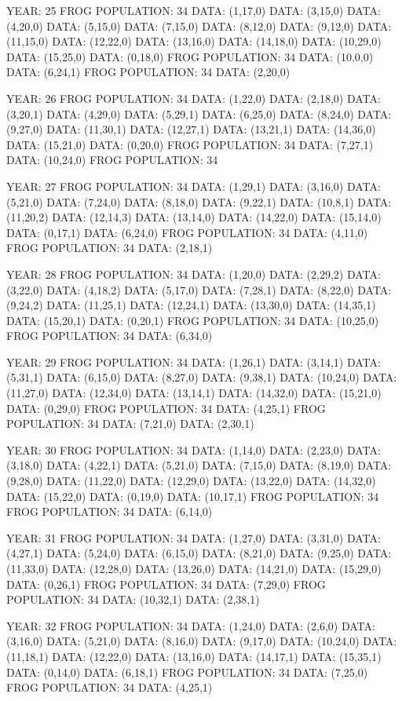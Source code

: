 \documentclass[12pt,a4paper]{article}
\begin{document}
{YEAR: 25
FROG POPULATION: 34
DATA: (1,17,0)
DATA: (3,15,0)
DATA: (4,20,0)
DATA: (5,15,0)
DATA: (7,15,0)
DATA: (8,12,0)
DATA: (9,12,0)
DATA: (11,15,0)
DATA: (12,22,0)
DATA: (13,16,0)
DATA: (14,18,0)
DATA: (10,29,0)
DATA: (15,25,0)
DATA: (0,18,0)
FROG POPULATION: 34
DATA: (10,0,0)
DATA: (6,24,1)
FROG POPULATION: 34
DATA: (2,20,0)

YEAR: 26
FROG POPULATION: 34
DATA: (1,22,0)
DATA: (2,18,0)
DATA: (3,20,1)
DATA: (4,29,0)
DATA: (5,29,1)
DATA: (6,25,0)
DATA: (8,24,0)
DATA: (9,27,0)
DATA: (11,30,1)
DATA: (12,27,1)
DATA: (13,21,1)
DATA: (14,36,0)
DATA: (15,21,0)
DATA: (0,20,0)
FROG POPULATION: 34
DATA: (7,27,1)
DATA: (10,24,0)
FROG POPULATION: 34

YEAR: 27
FROG POPULATION: 34
DATA: (1,29,1)
DATA: (3,16,0)
DATA: (5,21,0)
DATA: (7,24,0)
DATA: (8,18,0)
DATA: (9,22,1)
DATA: (10,8,1)
DATA: (11,20,2)
DATA: (12,14,3)
DATA: (13,14,0)
DATA: (14,22,0)
DATA: (15,14,0)
DATA: (0,17,1)
DATA: (6,24,0)
FROG POPULATION: 34
DATA: (4,11,0)
FROG POPULATION: 34
DATA: (2,18,1)

YEAR: 28
FROG POPULATION: 34
DATA: (1,20,0)
DATA: (2,29,2)
DATA: (3,22,0)
DATA: (4,18,2)
DATA: (5,17,0)
DATA: (7,28,1)
DATA: (8,22,0)
DATA: (9,24,2)
DATA: (11,25,1)
DATA: (12,24,1)
DATA: (13,30,0)
DATA: (14,35,1)
DATA: (15,20,1)
DATA: (0,20,1)
FROG POPULATION: 34
DATA: (10,25,0)
FROG POPULATION: 34
DATA: (6,34,0)

YEAR: 29
FROG POPULATION: 34
DATA: (1,26,1)
DATA: (3,14,1)
DATA: (5,31,1)
DATA: (6,15,0)
DATA: (8,27,0)
DATA: (9,38,1)
DATA: (10,24,0)
DATA: (11,27,0)
DATA: (12,34,0)
DATA: (13,14,1)
DATA: (14,32,0)
DATA: (15,21,0)
DATA: (0,29,0)
FROG POPULATION: 34
DATA: (4,25,1)
FROG POPULATION: 34
DATA: (7,21,0)
DATA: (2,30,1)

YEAR: 30
FROG POPULATION: 34
DATA: (1,14,0)
DATA: (2,23,0)
DATA: (3,18,0)
DATA: (4,22,1)
DATA: (5,21,0)
DATA: (7,15,0)
DATA: (8,19,0)
DATA: (9,28,0)
DATA: (11,22,0)
DATA: (12,29,0)
DATA: (13,22,0)
DATA: (14,32,0)
DATA: (15,22,0)
DATA: (0,19,0)
DATA: (10,17,1)
FROG POPULATION: 34
FROG POPULATION: 34
DATA: (6,14,0)

YEAR: 31
FROG POPULATION: 34
DATA: (1,27,0)
DATA: (3,31,0)
DATA: (4,27,1)
DATA: (5,24,0)
DATA: (6,15,0)
DATA: (8,21,0)
DATA: (9,25,0)
DATA: (11,33,0)
DATA: (12,28,0)
DATA: (13,26,0)
DATA: (14,21,0)
DATA: (15,29,0)
DATA: (0,26,1)
FROG POPULATION: 34
DATA: (7,29,0)
FROG POPULATION: 34
DATA: (10,32,1)
DATA: (2,38,1)

YEAR: 32
FROG POPULATION: 34
DATA: (1,24,0)
DATA: (2,6,0)
DATA: (3,16,0)
DATA: (5,21,0)
DATA: (8,16,0)
DATA: (9,17,0)
DATA: (10,24,0)
DATA: (11,18,1)
DATA: (12,22,0)
DATA: (13,16,0)
DATA: (14,17,1)
DATA: (15,35,1)
DATA: (0,14,0)
DATA: (6,18,1)
FROG POPULATION: 34
DATA: (7,25,0)
FROG POPULATION: 34
DATA: (4,25,1)

}
\end{document}
